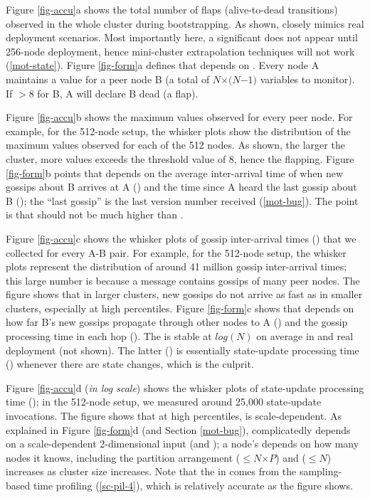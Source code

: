 Figure \ref{fig-accu}a shows the total number of flaps (alive-to-dead
transitions) observed in the whole cluster during bootstrapping.  
As shown, \sck closely mimics
real deployment scenarios.  Most importantly here, a significant \flaps
does not appear until 256-node deployment, 
hence mini-cluster extrapolation techniques will not work (\sec\ref{mot-state}).
%
Figure \ref{fig-form}a defines that \flaps depends on 
\phi \cite{Hayashibara+04-PhiFailureDetector}.  Every node A
maintains a \phi value for a peer node B (a total of $N$$\times$$(N$$-$$1)$
variables to monitor).  If \phi$>$8 for B, A will declare B dead (a flap).

Figure \ref{fig-accu}b shows the maximum \phi values observed for every
peer node.  For example, for the 512-node setup, the whisker plots show the
distribution of the maximum \phi values observed for each of the 512
nodes.  As shown, the larger the cluster, more \phi values exceeds the
threshold value of 8, hence the flapping.
%
Figure \ref{fig-form}b points that \phi depends on the average
inter-arrival time of when new gossips about B arrives at A (\gosAvg) and the
time since A heard the last gossip about B (\gosLast); the ``last gossip''
is the last version number received (\sec\ref{mot-bug}).  The point is that
\gosLast should not be much higher than \gosAvg.






Figure \ref{fig-accu}c shows the whisker plots of gossip inter-arrival
times (\gosLast) that we collected for every A-B pair.  For example, for the
512-node setup, the whisker plots represent the distribution of 
around 41 million 
gossip inter-arrival times; this large number is because a message
contains gossips of many peer nodes.  The figure shows that in larger
clusters, new gossips do not arrive as fast as in smaller clusters,
especially at high percentiles.
%
Figure \ref{fig-form}c shows that \gosLast depends on how far B's new
gossips propagate through other nodes to A (\hops) and the gossip
processing time in each hop (\gosProc).  The \hops is stable
at $log(N)$ on average in \sck and real deployment (not shown).  The
latter (\gosProc) is essentially state-update processing time (\supProc)
whenever there are state changes, which is the culprit.

Figure \ref{fig-accu}d ({\em in log scale}) shows the whisker plots of
state-update processing time (\supProc); in the 512-node setup, we
measured around 25,000 state-update invocations.  The figure shows that at high
percentiles, \supProc is scale-dependent.  As explained in 
Figure \ref{fig-form}d (and Section \ref{mot-bug}), \supProc complicatedly
depends on a scale-dependent 2-dimensional input (\ringTable and
\newStates); a node's \ringTable depends on how many nodes it knows,
including the partition arrangement ($\leq$$N$$\times$$P$) and \newStates
($\leq$$N$) increases as cluster size increases.
%
%
Note that the \supProc in \sck comes from the sampling-based time
profiling (\sec\ref{sc-pil-4}), which is relatively accurate as the figure
shows.

